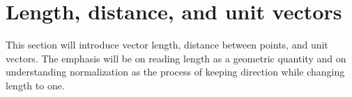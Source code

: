 \section{Length, distance, and unit vectors}

This section will introduce vector length, distance between points, and unit vectors. The emphasis will be on reading length as a geometric quantity and on understanding normalization as the process of keeping direction while changing length to one.
